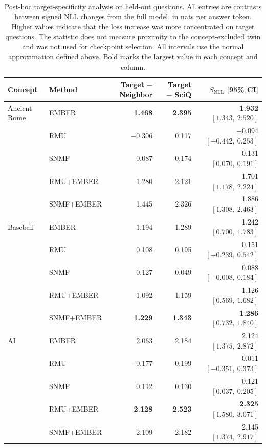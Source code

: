\begin{table}[h]
  \centering
  \small
  \begin{tabular}{llrrr}
    \toprule
    Concept & Method & Target $-$ Neighbor & Target $-$ SciQ
      & $S_{\mathrm{NLL}}$ [95\% CI] \\
    \midrule
    Ancient Rome & EMBER & \textbf{1.468} & \textbf{2.395} & \textbf{1.932 $[1.343,\ 2.520]$} \\
                 & RMU   & $-0.306$ & 0.117 & $-0.094$ $[-0.442,\ 0.253]$ \\
                 & SNMF  & 0.087 & 0.174 & 0.131 $[0.070,\ 0.191]$ \\
                 & RMU+EMBER & 1.280 & 2.121 & 1.701 $[1.178,\ 2.224]$ \\
                 & SNMF+EMBER & 1.445 & 2.326 & 1.886 $[1.308,\ 2.463]$ \\
    \midrule
    Baseball     & EMBER & 1.194 & 1.289 & 1.242 $[0.700,\ 1.783]$ \\
                 & RMU   & 0.108 & 0.195 & 0.151 $[-0.239,\ 0.542]$ \\
                 & SNMF  & 0.127 & 0.049 & 0.088 $[-0.008,\ 0.184]$ \\
                 & RMU+EMBER & 1.092 & 1.159 & 1.126 $[0.569,\ 1.682]$ \\
                 & SNMF+EMBER & \textbf{1.229} & \textbf{1.343} & \textbf{1.286 $[0.732,\ 1.840]$} \\
    \midrule
    AI           & EMBER & 2.063 & 2.184 & 2.124 $[1.375,\ 2.872]$ \\
                 & RMU   & $-0.177$ & 0.199 & 0.011 $[-0.351,\ 0.373]$ \\
                 & SNMF  & 0.112 & 0.130 & 0.121 $[0.037,\ 0.205]$ \\
                 & RMU+EMBER & \textbf{2.128} & \textbf{2.523} & \textbf{2.325 $[1.580,\ 3.071]$} \\
                 & SNMF+EMBER & 2.109 & 2.182 & 2.145 $[1.374,\ 2.917]$ \\
    \bottomrule
  \end{tabular}
  \caption{Post-hoc target-specificity analysis on held-out questions. All
  entries are contrasts between signed NLL changes from the full model, in
  nats per answer token. Higher values indicate that the loss increase was
  more concentrated on target questions. The statistic does not measure
  proximity to the concept-excluded twin and was not used for checkpoint
  selection. All intervals use the normal approximation defined above.
  Bold marks the largest value in each concept and column.}
  \label{tab:nll-selectivity}
\end{table}
